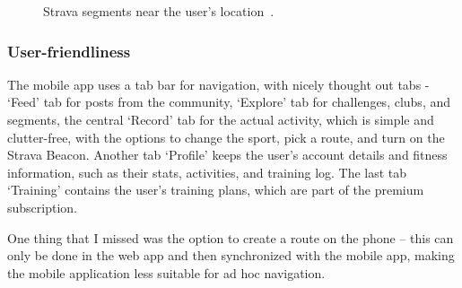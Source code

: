 \begin{figure}[htb!]
    \centering
        \caption{Strava segments near the user's location~\cite{strava-segments-img}.}
        \label{strava-segments-img}
\end{figure}

\subsubsection*{User-friendliness}
The mobile app uses a tab bar for navigation, with nicely thought out tabs - `Feed' tab for posts from the community, `Explore' tab for challenges, clubs, and segments,
the central `Record' tab for the actual activity, which is simple and clutter-free, with the options to change the sport, pick a route, and turn on the Strava Beacon.
Another tab `Profile' keeps the user's account details and fitness information, such as their stats, activities, and training log.
The last tab `Training' contains the user's training plans, which are part of the premium subscription.

One thing that I missed was the option to create a route on the phone -- this can only be done in the web app and then synchronized with the mobile app, making the mobile application less suitable for ad hoc navigation.

